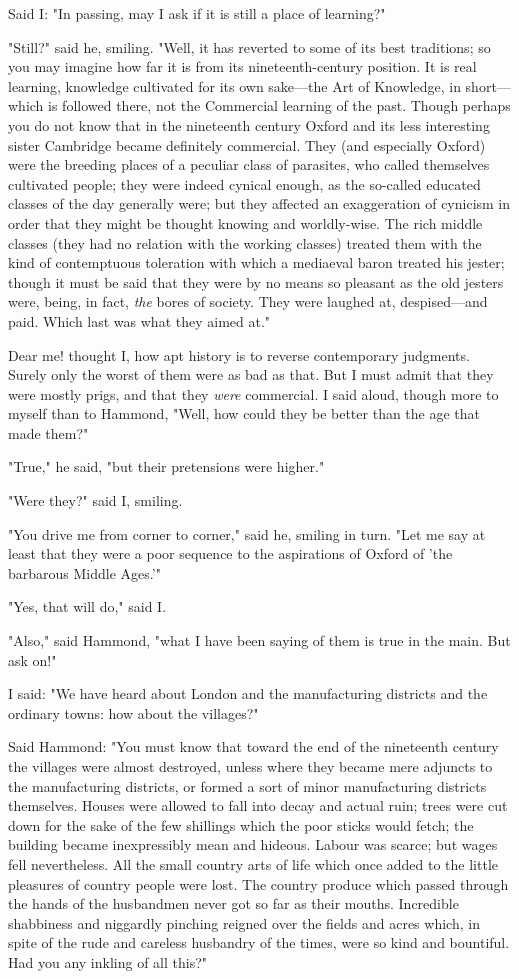 Said I: "In passing, may I ask if it is still a place of learning?"

"Still?" said he, smiling. "Well, it has reverted to some of its best
traditions; so you may imagine how far it is from its nineteenth-century
position. It is real learning, knowledge cultivated for its own
sake---the Art of Knowledge, in short---which is followed there, not the
Commercial learning of the past. Though perhaps you do not know that in
the nineteenth century Oxford and its less interesting sister Cambridge
became definitely commercial. They (and especially Oxford) were the
breeding places of a peculiar class of parasites, who called themselves
cultivated people; they were indeed cynical enough, as the so-called
educated classes of the day generally were; but they affected an
exaggeration of cynicism in order that they might be thought knowing and
worldly-wise. The rich middle classes (they had no relation with the
working classes) treated them with the kind of contemptuous toleration
with which a mediaeval baron treated his jester; though it must be said
that they were by no means so pleasant as the old jesters were, being,
in fact, \emph{the} bores of society. They were laughed at,
despised---and paid. Which last was what they aimed at."

Dear me! thought I, how apt history is to reverse contemporary
judgments. Surely only the worst of them were as bad as that. But I must
admit that they were mostly prigs, and that they \emph{were} commercial.
I said aloud, though more to myself than to Hammond, "Well, how could
they be better than the age that made them?"

"True," he said, "but their pretensions were higher."

"Were they?" said I, smiling.

"You drive me from corner to corner," said he, smiling in turn. "Let me
say at least that they were a poor sequence to the aspirations of Oxford
of 'the barbarous Middle Ages.'"

"Yes, that will do," said I.

"Also," said Hammond, "what I have been saying of them is true in the
main. But ask on!"

I said: "We have heard about London and the manufacturing districts and
the ordinary towns: how about the villages?"

Said Hammond: "You must know that toward the end of the nineteenth
century the villages were almost destroyed, unless where they became
mere adjuncts to the manufacturing districts, or formed a sort of minor
manufacturing districts themselves. Houses were allowed to fall into
decay and actual ruin; trees were cut down for the sake of the few
shillings which the poor sticks would fetch; the building became
inexpressibly mean and hideous. Labour was scarce; but wages fell
nevertheless. All the small country arts of life which once added to the
little pleasures of country people were lost. The country produce which
passed through the hands of the husbandmen never got so far as their
mouths. Incredible shabbiness and niggardly pinching reigned over the
fields and acres which, in spite of the rude and careless husbandry of
the times, were so kind and bountiful. Had you any inkling of all this?"


